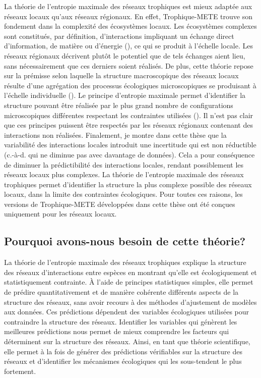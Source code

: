 La théorie de l'entropie maximale des réseaux trophiques est mieux adaptée aux
réseaux locaux qu'aux réseaux régionaux. En effet, Trophique-METE trouve son
fondement dans la complexité des écosystèmes locaux. Les écosystèmes complexes
sont constitués, par définition, d'interactions impliquant un échange direct
d'information, de matière ou d'énergie (\cite{Ladyman2013What}), ce qui se
produit à l'échelle locale. Les réseaux régionaux décrivent plutôt le potentiel
que de tels échanges aient lieu, sans nécessairement que ces derniers soient
réalisés. De plus, cette théorie repose sur la prémisse selon laquelle la
structure macroscopique des réseaux locaux résulte d'une agrégation des
processus écologiques microscopiques se produisant à l'échelle individuelle
(\cite{Frank2009Common}). Le principe d'entropie maximale permet d'identifier la
structure pouvant être réalisée par le plus grand nombre de configurations
microscopiques différentes respectant les contraintes utilisées
(\cite{Dewar2008Statistical}). Il n'est pas clair que ces principes puissent
être respectés par les réseaux régionaux contenant des interactions non
réalisées. Finalement, je montre dans cette thèse que la variabilité des
interactions locales introduit une incertitude qui est non réductible (c.-à-d.
qui ne diminue pas avec davantage de données). Cela a pour conséquence de
diminuer la prédictibilité des interactions locales, rendant possiblement les
réseaux locaux plus complexes. La théorie de l'entropie maximale des réseaux
trophiques permet d'identifier la structure la plus complexe possible des
réseaux locaux, dans la limite des contraintes écologiques. Pour toutes ces
raisons, les versions de Trophique-METE développées dans cette thèse ont été
conçues uniquement pour les réseaux locaux. 

\subsection{Pourquoi avons-nous besoin de cette théorie?} 

La théorie de l'entropie maximale des réseaux trophiques explique la structure
des réseaux d'interactions entre espèces en montrant qu'elle est écologiquement
et statistiquement contrainte. À l'aide de principes statistiques simples, elle
permet de prédire quantitativement et de manière cohérente différents aspects de
la structure des réseaux, sans avoir recours à des méthodes d'ajustement de
modèles aux données. Ces prédictions dépendent des variables écologiques
utilisées pour contraindre la structure des réseaux. Identifier les variables
qui génèrent les meilleures prédictions nous permet de mieux comprendre les
facteurs qui déterminent sur la structure des réseaux. Ainsi, en tant que théorie
scientifique, elle permet à la fois de générer des prédictions vérifiables sur
la structure des réseaux et d'identifier les mécanismes écologiques qui les
sous-tendent le plus fortement. 

